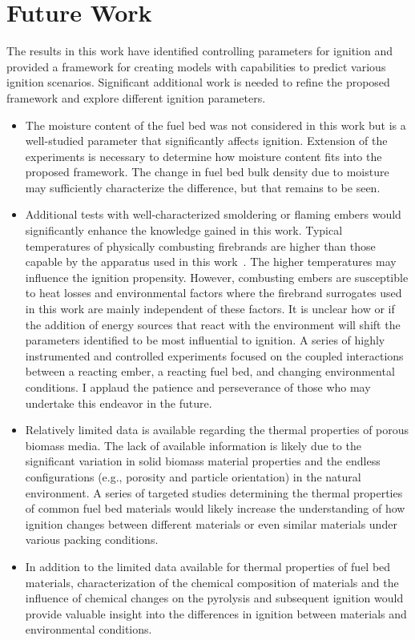 \section{Future Work}
  The results in this work have identified controlling parameters for ignition and provided a framework for creating models with capabilities to predict various ignition scenarios. Significant additional work is needed to refine the proposed framework and explore different ignition parameters. 
        \begin{itemize}
            \item The moisture content of the fuel bed was not considered in this work but is a well-studied parameter that significantly affects ignition. Extension of the experiments is necessary to determine how moisture content fits into the proposed framework. The change in fuel bed bulk density due to moisture may sufficiently characterize the difference, but that remains to be seen.
            
            \item Additional tests with well-characterized smoldering or flaming embers would significantly enhance the knowledge gained in this work. Typical temperatures of physically combusting firebrands are higher than those capable by the apparatus used in this work~\cite{Fateev2017a}. The higher temperatures may influence the ignition propensity. However, combusting embers are susceptible to heat losses and environmental factors where the firebrand surrogates used in this work are mainly independent of these factors. It is unclear how or if the addition of energy sources that react with the environment will shift the parameters identified to be most influential to ignition. A series of highly instrumented and controlled experiments focused on the coupled interactions between a reacting ember, a reacting fuel bed, and changing environmental conditions. I applaud the patience and perseverance of those who may undertake this endeavor in the future. 
            
            \item Relatively limited data is available regarding the thermal properties of porous biomass media. The lack of available information is likely due to the significant variation in solid biomass material properties and the endless configurations (e.g., porosity and particle orientation) in the natural environment. A series of targeted studies determining the thermal properties of common fuel bed materials would likely increase the understanding of how ignition changes between different materials or even similar materials under various packing conditions.
            
            \item In addition to the limited data available for thermal properties of fuel bed materials, characterization of the chemical composition of materials and the influence of chemical changes on the pyrolysis and subsequent ignition would provide valuable insight into the differences in ignition between materials and environmental conditions. 
        \end{itemize}